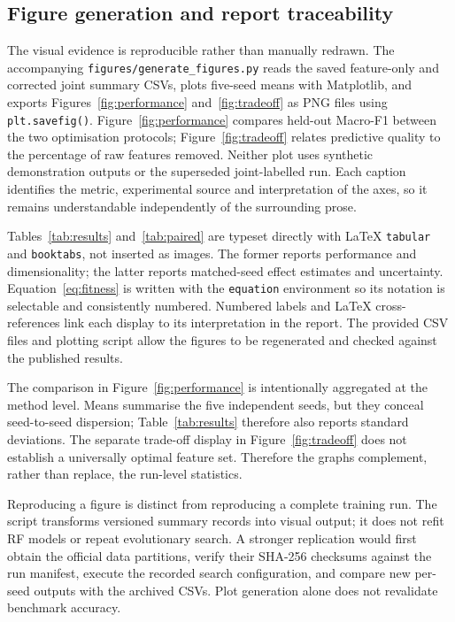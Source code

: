 \documentclass[10pt,a4paper,twocolumn]{extarticle}
\begin{document}
\subsection{Figure generation and report traceability}
The visual evidence is reproducible rather than manually redrawn. The accompanying \texttt{figures/generate\_figures.py} reads the saved feature-only and corrected joint summary CSVs, plots five-seed means with Matplotlib, and exports Figures~\ref{fig:performance} and~\ref{fig:tradeoff} as PNG files using \texttt{plt.savefig()}. Figure~\ref{fig:performance} compares held-out Macro-F1 between the two optimisation protocols; Figure~\ref{fig:tradeoff} relates predictive quality to the percentage of raw features removed. Neither plot uses synthetic demonstration outputs or the superseded joint-labelled run. Each caption identifies the metric, experimental source and interpretation of the axes, so it remains understandable independently of the surrounding prose.

Tables~\ref{tab:results} and~\ref{tab:paired} are typeset directly with LaTeX \texttt{tabular} and \texttt{booktabs}, not inserted as images. The former reports performance and dimensionality; the latter reports matched-seed effect estimates and uncertainty. Equation~\eqref{eq:fitness} is written with the \texttt{equation} environment so its notation is selectable and consistently numbered. Numbered labels and LaTeX cross-references link each display to its interpretation in the report. The provided CSV files and plotting script allow the figures to be regenerated and checked against the published results.


The comparison in Figure~\ref{fig:performance} is intentionally aggregated at the method level. Means summarise the five independent seeds, but they conceal seed-to-seed dispersion; Table~\ref{tab:results} therefore also reports standard deviations. The separate trade-off display in Figure~\ref{fig:tradeoff} does not establish a universally optimal feature set. Therefore the graphs complement, rather than replace, the run-level statistics.

Reproducing a figure is distinct from reproducing a complete training run. The script transforms versioned summary records into visual output; it does not refit RF models or repeat evolutionary search. A stronger replication would first obtain the official data partitions, verify their SHA-256 checksums against the run manifest, execute the recorded search configuration, and compare new per-seed outputs with the archived CSVs. Plot generation alone does not revalidate benchmark accuracy.
\end{document}
